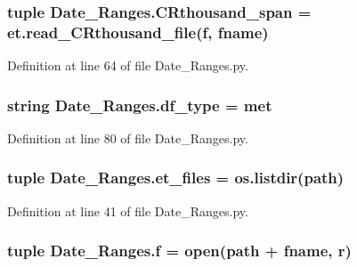 \subsubsection[{C\+Rthousand\+\_\+span}]{\setlength{\rightskip}{0pt plus 5cm}tuple Date\+\_\+\+Ranges.\+C\+Rthousand\+\_\+span = et.\+read\+\_\+\+C\+Rthousand\+\_\+file({\bf f}, fname)}\label{namespace_date___ranges_ab7a9f3dbdd1532a99ec785cb471b70b7}


Definition at line 64 of file Date\+\_\+\+Ranges.\+py.

\hypertarget{namespace_date___ranges_a605d356940e408c8334d1e34c3a5c8e9}{}
\subsubsection[{df\+\_\+type}]{\setlength{\rightskip}{0pt plus 5cm}string Date\+\_\+\+Ranges.\+df\+\_\+type = \textquotesingle{}met\textquotesingle{}}\label{namespace_date___ranges_a605d356940e408c8334d1e34c3a5c8e9}


Definition at line 80 of file Date\+\_\+\+Ranges.\+py.

\hypertarget{namespace_date___ranges_adee3fa20a1eb91e33335d0ab5b4c98c1}{}
\subsubsection[{et\+\_\+files}]{\setlength{\rightskip}{0pt plus 5cm}tuple Date\+\_\+\+Ranges.\+et\+\_\+files = os.\+listdir({\bf path})}\label{namespace_date___ranges_adee3fa20a1eb91e33335d0ab5b4c98c1}


Definition at line 41 of file Date\+\_\+\+Ranges.\+py.

\hypertarget{namespace_date___ranges_afc7dea9c3c3f747aa8fb116c9272c535}{}
\subsubsection[{f}]{\setlength{\rightskip}{0pt plus 5cm}tuple Date\+\_\+\+Ranges.\+f = open({\bf path} + fname, \textquotesingle{}r\textquotesingle{})}\label{namespace_date___ranges_afc7dea9c3c3f747aa8fb116c9272c535}


